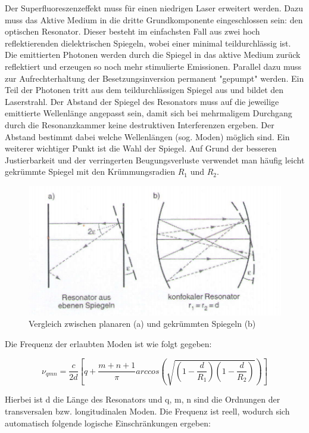 Der Superfluoreszenzeffekt muss für einen niedrigen Laser erweitert werden. Dazu muss das Aktive Medium in die dritte Grundkomponente eingeschlossen sein: den optischen Resonator. Dieser besteht im einfachsten Fall aus zwei hoch reflektierenden dielektrischen Spiegeln, wobei einer minimal teildurchlässig ist. Die emittierten  Photonen werden durch die Spiegel in das aktive Medium zurück reflektiert und erzeugen so noch mehr stimulierte Emissionen. Parallel dazu muss zur Aufrechterhaltung der Besetzungsinversion permanent "gepumpt" werden. Ein Teil der Photonen tritt aus dem teildurchlässigen Spiegel aus und bildet den Laserstrahl. Der Abstand der Spiegel des Resonators muss auf die jeweilige emittierte Wellenlänge angepasst sein, damit sich bei mehrmaligem Durchgang durch  die Resonanzkammer keine destruktiven Interferenzen ergeben. Der Abstand bestimmt dabei welche Wellenlängen (sog. Moden) möglich sind.
Ein weiterer wichtiger Punkt ist die Wahl der Spiegel. Auf Grund der besseren Justierbarkeit und der verringerten Beugungsverluste verwendet man häufig leicht gekrümmte Spiegel mit den Krümmungsradien $R_1$ und $R_2$. 

\begin{figure}[here]
\centering
\includegraphics[scale=0.7]{img/HNL5}
\caption{Vergleich zwischen planaren (a) und gekrümmten Spiegeln (b)}
\begin{center}
\end{center}
\end{figure}

\newpage
Die Frequenz der erlaubten Moden ist wie folgt gegeben:

\begin{equation}
\nu_{qmn}=\frac{c}{2d}\left[q+\frac{m+n+1}{\pi} arccos\left(\sqrt{\left(1-\frac{d}{R_1}\right)\left(1-\frac{d}{R_2}\right)}\right)\right]
\end{equation}

Hierbei ist d die Länge des Resonators und q, m, n sind die Ordnungen der transversalen bzw. longitudinalen Moden. Die Frequenz ist reell, wodurch sich automatisch folgende logische Einschränkungen ergeben:

